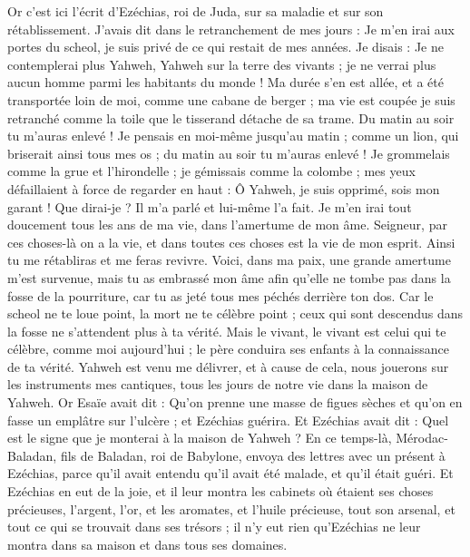 \begin{multicols}{2}
Or c'est ici l'écrit d'Ezéchias, roi de Juda, sur sa maladie et sur son rétablissement.
J'avais dit dans le retranchement de mes jours : Je m'en irai aux portes du scheol, je suis privé de ce qui restait de mes années.
Je disais : Je ne contemplerai plus Yahweh, Yahweh sur la terre des vivants ; je ne verrai plus aucun homme parmi les habitants du monde !
Ma durée s'en est allée, et a été transportée loin de moi, comme une cabane de berger ; ma vie est coupée je suis retranché comme la toile que le tisserand détache de sa trame. Du matin au soir tu m'auras enlevé !
Je pensais en moi-même jusqu'au matin ; comme un lion, qui briserait ainsi tous mes os ; du matin au soir tu m'auras enlevé !
Je grommelais comme la grue et l'hirondelle ; je gémissais comme la colombe ; mes yeux défaillaient à force de regarder en haut : Ô Yahweh, je suis opprimé, sois mon garant !
Que dirai-je ? Il m'a parlé et lui-même l'a fait. Je m'en irai tout doucement tous les ans de ma vie, dans l'amertume de mon âme.
Seigneur, par ces choses-là on a la vie, et dans toutes ces choses est la vie de mon esprit. Ainsi tu me rétabliras et me feras revivre.
Voici, dans ma paix, une grande amertume m'est survenue, mais tu as embrassé mon âme afin qu'elle ne tombe pas dans la fosse de la pourriture, car tu as jeté tous mes péchés derrière ton dos.
Car le scheol ne te loue point, la mort ne te célèbre point ; ceux qui sont descendus dans la fosse ne s'attendent plus à ta vérité.
Mais le vivant, le vivant est celui qui te célèbre, comme moi aujourd'hui ; le père conduira ses enfants à la connaissance de ta vérité.
Yahweh est venu me délivrer, et à cause de cela, nous jouerons sur les instruments mes cantiques, tous les jours de notre vie dans la maison de Yahweh.
Or Esaïe avait dit : Qu'on prenne une masse de figues sèches et qu'on en fasse un emplâtre sur l'ulcère ; et Ezéchias guérira.
Et Ezéchias avait dit : Quel est le signe que je monterai à la maison de Yahweh ?
\VerseOne{}En ce temps-là, Mérodac-Baladan, fils de Baladan, roi de Babylone, envoya des lettres avec un présent à Ezéchias, parce qu'il avait entendu qu'il avait été malade, et qu'il était guéri.
Et Ezéchias en eut de la joie, et il leur montra les cabinets où étaient ses choses précieuses, l'argent, l'or, et les aromates, et l'huile précieuse, tout son arsenal, et tout ce qui se trouvait dans ses trésors ; il n'y eut rien qu'Ezéchias ne leur montra dans sa maison et dans tous ses domaines.

\end{multicols}
